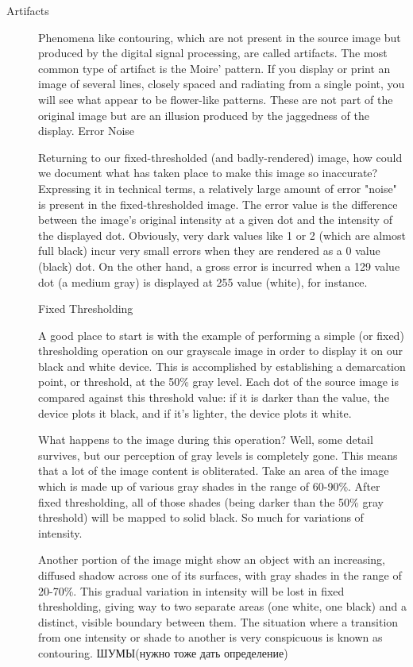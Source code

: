\Defines %
\begin{description}
\item[Artifacts] 

Phenomena like contouring, which are not present in the source image but
produced by the digital signal processing, are called artifacts.  The most
common type of artifact is the Moire' pattern.  If you display or print an
image of several lines, closely spaced and radiating from a single point,
you will see what appear to be flower-like patterns.  These are not part of
the original image but are an illusion produced by the jaggedness of the
display.\cite{Dh}
Error Noise

Returning to our fixed-thresholded (and badly-rendered) image, how could we
document what has taken place to make this image so inaccurate?  Expressing
it in technical terms, a relatively large amount of error "noise" is present
in the fixed-thresholded image.  The error value is the difference between
the image's original intensity at a given dot and the intensity of the
displayed dot.  Obviously, very dark values like 1 or 2 (which are almost
full black) incur very small errors when they are rendered as a 0 value
(black) dot.  On the other hand, a gross error is incurred when a 129 value
dot (a medium gray) is displayed at 255 value (white), for instance.\cite{Dh}

Fixed Thresholding

A good place to start is with the example of performing a simple (or fixed)
thresholding operation on our grayscale image in order to display it on our
black and white device.  This is accomplished by establishing a demarcation
point, or threshold, at the 50\% gray level.  Each dot of the source image is
compared against this threshold value: if it is darker than the value, the
device plots it black, and if it's lighter, the device plots it white.

What happens to the image during this operation?  Well, some detail
survives, but our perception of gray levels is completely gone.  This means
that a lot of the image content is obliterated.  Take an area of the image
which is made up of various gray shades in the range of 60-90\%.  After fixed
thresholding, all of those shades (being darker than the 50\% gray threshold)
will be mapped to solid black.  So much for variations of intensity.

Another portion of the image might show an object with an increasing,
diffused shadow across one of its surfaces, with gray shades in the range of
20-70\%.  This gradual variation in intensity will be lost in fixed
thresholding, giving way to two separate areas (one white, one black) and a
distinct, visible boundary between them.  The situation where a transition
from one intensity or shade to another is very conspicuous is known as
contouring.\cite{Dh}
ШУМЫ(нужно тоже дать определение)
\end{description}

